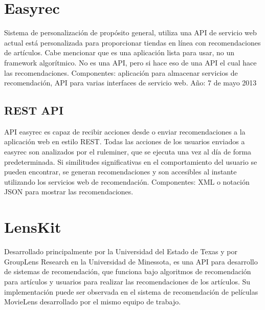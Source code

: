   \section{Easyrec}
    Sistema de personalización de propósito general, utiliza una API de servicio web actual está personalizada para proporcionar tiendas en línea con recomendaciones de artículos. Cabe mencionar que es una aplicación lista para usar, no un framework algorítmico. No es una API, pero si hace eso de una API el cual hace las recomendaciones. Componentes: aplicación para almacenar servicios de recomendación, API para varias interfaces de servicio web. Año: 7 de mayo 2013\cite{7}

    \subsection{REST API}
      API easyrec es capaz de recibir acciones desde o enviar recomendaciones a la aplicación web en estilo REST. Todas las acciones de los usuarios enviados a easyrec son analizados por el ruleminer, que se ejecuta una vez al día de forma predeterminada. Si similitudes significativas en el comportamiento del usuario se pueden encontrar, se generan recomendaciones y son accesibles al instante utilizando los servicios web de recomendación. Componentes: XML o notación JSON para mostrar las recomendaciones. \cite{8}

  \section{LensKit}
    Desarrollado principalmente por la Universidad del Estado de Texas y por GroupLens Research en la Universidad de Minessota, es una API para desarrollo de sistemas de recomendación, que funciona bajo algoritmos de recomendación para artículos y usuarios para realizar las recomendaciones de los artículos. Su implementación puede ser observada en el sistema de recomendación de películas MovieLens desarrollado por el mismo equipo de trabajo. \cite{11}
    
